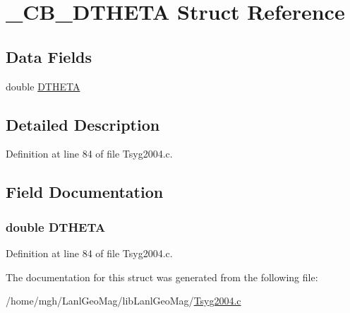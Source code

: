 \hypertarget{struct___c_b___d_t_h_e_t_a}{
\section{\_\-CB\_\-DTHETA Struct Reference}
\label{struct___c_b___d_t_h_e_t_a}
}
\subsection*{Data Fields}
\begin{CompactItemize}
\item 
double \hyperlink{struct___c_b___d_t_h_e_t_a_4a563a70a3df6760bcba2788ae797e76}{DTHETA}
\end{CompactItemize}


\subsection{Detailed Description}


Definition at line 84 of file Tsyg2004.c.

\subsection{Field Documentation}
\hypertarget{struct___c_b___d_t_h_e_t_a_4a563a70a3df6760bcba2788ae797e76}{
\subsubsection[{DTHETA}]{\setlength{\rightskip}{0pt plus 5cm}double {\bf DTHETA}}}
\label{struct___c_b___d_t_h_e_t_a_4a563a70a3df6760bcba2788ae797e76}




Definition at line 84 of file Tsyg2004.c.

The documentation for this struct was generated from the following file:\begin{CompactItemize}
\item 
/home/mgh/LanlGeoMag/libLanlGeoMag/\hyperlink{_tsyg2004_8c}{Tsyg2004.c}\end{CompactItemize}

